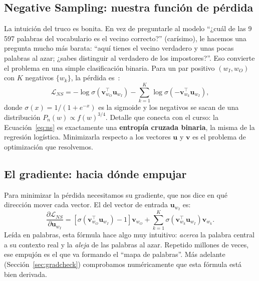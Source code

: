 \documentclass[11pt]{article}
\begin{document}
\subsection{Negative Sampling: nuestra función de pérdida}
La intuición del truco es bonita. En vez de preguntarle al modelo ``¿cuál de las 9\,597
palabras del vocabulario es el vecino correcto?'' (carísimo), le hacemos una pregunta mucho
más barata: ``aquí tienes el vecino verdadero y unas pocas palabras al azar; ¿sabes
distinguir al verdadero de los impostores?''. Eso convierte el problema en una simple
clasificación binaria. Para un par positivo $(w_I, w_O)$ con $K$ negativos $\{w_k\}$, la
pérdida es~\cite{mikolov2013b}:
\begin{equation}\label{eq:ns}
\mathcal{L}_{NS} = -\log\sigma\!\left(\mathbf{v}_{w_O}^{\top}\mathbf{u}_{w_I}\right)
- \sum_{k=1}^{K}\log\sigma\!\left(-\mathbf{v}_{w_k}^{\top}\mathbf{u}_{w_I}\right),
\end{equation}
donde $\sigma(x)=1/(1+e^{-x})$ es la sigmoide y los negativos se sacan de una distribución
$P_n(w)\propto f(w)^{3/4}$. Detalle que conecta con el curso: la Ecuación~\eqref{eq:ns} es
exactamente una \textbf{entropía cruzada binaria}, la misma de la regresión logística.
Minimizarla respecto a los vectores $\mathbf{u}$ y $\mathbf{v}$ es el problema de
optimización que resolvemos.

\subsection{El gradiente: hacia dónde empujar}
Para minimizar la pérdida necesitamos su gradiente, que nos dice en qué dirección mover cada
vector. El del vector de entrada $\mathbf{u}_{w_I}$ es:
\begin{equation}\label{eq:grad}
\frac{\partial \mathcal{L}_{NS}}{\partial \mathbf{u}_{w_I}} =
\left[\sigma\!\left(\mathbf{v}_{w_O}^{\top}\mathbf{u}_{w_I}\right)-1\right]\mathbf{v}_{w_O}
+ \sum_{k=1}^{K}\sigma\!\left(\mathbf{v}_{w_k}^{\top}\mathbf{u}_{w_I}\right)\mathbf{v}_{w_k}.
\end{equation}
Leída en palabras, esta fórmula hace algo muy intuitivo: \emph{acerca} la palabra central a
su contexto real y la \emph{aleja} de las palabras al azar. Repetido millones de veces, ese
empujón es el que va formando el ``mapa de palabras''. Más adelante (Sección~\ref{sec:gradcheck})
comprobamos numéricamente que esta fórmula está bien derivada.
\end{document}
